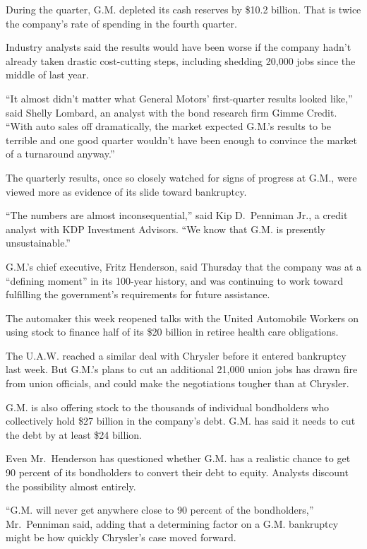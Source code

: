 \documentclass[12pt,a4paper,onecolumn]{article}
\begin{document}
During the quarter, G.M. depleted its cash reserves by \$10.2 billion. That is twice the company's
rate of spending in the fourth quarter.

Industry analysts said the results would have been worse if the company hadn't already taken drastic
cost-cutting steps, including shedding 20,000 jobs since the middle of last year.

``It almost didn't matter what General Motors' first-quarter results looked like,'' said Shelly
Lombard, an analyst with the bond research firm Gimme Credit. ``With auto sales off dramatically,
the market expected G.M.'s results to be terrible and one good quarter wouldn't have been enough to
convince the market of a turnaround anyway.''

The quarterly results, once so closely watched for signs of progress at G.M., were viewed more as
evidence of its slide toward bankruptcy.

``The numbers are almost inconsequential,'' said Kip D.~Penniman Jr., a credit analyst with KDP
Investment Advisors. ``We know that G.M. is presently unsustainable.''

G.M.'s chief executive, Fritz Henderson, said Thursday that the company was at a ``defining moment''
in its 100-year history, and was continuing to work toward fulfilling the government's requirements
for future assistance.

The automaker this week reopened talks with the United Automobile Workers on using stock to finance
half of its \$20 billion in retiree health care obligations.

The U.A.W. reached a similar deal with Chrysler before it entered bankruptcy last week. But G.M.'s
plans to cut an additional 21,000 union jobs has drawn fire from union officials, and could make the
negotiations tougher than at Chrysler.

G.M. is also offering stock to the thousands of individual bondholders who collectively hold \$27
billion in the company's debt. G.M. has said it needs to cut the debt by at least \$24 billion.

Even Mr.~Henderson has questioned whether G.M. has a realistic chance to get 90 percent of its
bondholders to convert their debt to equity. Analysts discount the possibility almost entirely.

``G.M. will never get anywhere close to 90 percent of the bondholders,'' Mr.~Penniman said, adding
that a determining factor on a G.M. bankruptcy might be how quickly Chrysler's case moved forward.
\end{document}
